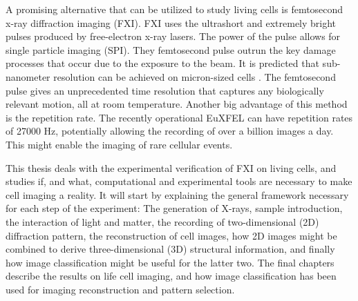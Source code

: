 A promising alternative that can be utilized to study living cells is femtosecond x-ray diffraction imaging (FXI). FXI uses the ultrashort and extremely bright pulses produced by free-electron x-ray lasers. The power of the pulse allows for single particle imaging (SPI). They femtosecond pulse outrun the key damage processes that occur due to the exposure to the beam. It is predicted that sub-nanometer resolution can be achieved on micron-sized cells  \cite{Bergh2008}. The femtosecond pulse gives an unprecedented time resolution that captures any biologically relevant motion, all at room temperature. Another big advantage of this method is the repetition rate. The recently operational EuXFEL can have repetition rates of 27000 Hz, potentially allowing the recording of over a billion images a day. This might enable the imaging of rare cellular events.

This thesis deals with the experimental verification of FXI on living cells, and studies if, and what, computational and experimental tools are necessary to make cell imaging a reality. It will start by explaining the general framework necessary for each step of the experiment: The generation of X-rays, sample introduction, the interaction of light and matter, the recording of two-dimensional (2D) diffraction pattern, the reconstruction of cell images, how 2D images might be combined to derive three-dimensional (3D) structural information, and finally how image classification might be useful for the latter two. The final chapters describe the results on life cell imaging, and how image classification has been used for imaging reconstruction and pattern selection.



